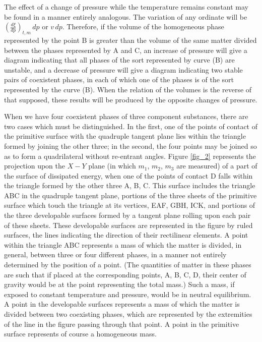 \documentclass[12pt]{memoir}
\begin{document}
The effect of a change of pressure while the temperature remains constant may be found in a manner entirely analogous. The variation of any ordinate will be $\left(\frac{d \xi}{dp}\right)_{t,m} \, dp$ or $v \, dp$.  Therefore, if the volume of the homogeneous phase represented by the point B is greater than the volume of the same matter divided between the phases represented by A and C, an increase of pressure will give a diagram indicating that all phases of the sort represented by curve (B) are unstable, and a decrease of pressure will give a diagram indicating two stable pairs of coexistent phases, in each of which one of the phases is of the sort represented by the curve (B). When the relation of the volumes is the reverse of that supposed, these results will be produced by the opposite changes of pressure.


When we have four coexistent phases of three component substances, there are two cases which must be distinguished. In the first, one of the points of contact of the primitive surface with the quadruple tangent plane lies within the triangle formed by joining the other three; in the second, the four points may be joined so as to form a quadrilateral without re-entrant angles. Figure \ref{fig_2} represents the projection upon the $X\!-Y$ plane (in which $m_1$, $m_2$, $m_3$ are measured) of a part of the surface of dissipated energy, when one of the points of contact D falls within the triangle formed by the other three A, B, C. This surface includes the triangle ABC in the quadruple tangent plane, portions of the three sheets of the primitive surface which touch the triangle at its vertices, EAF, GBH, ICK, and portions of the three developable surfaces formed by a tangent plane rolling upon each pair of these sheets. These developable surfaces are represented in the figure by ruled surfaces, the lines indicating the direction of their rectilinear elements. A point within the triangle ABC represents a mass of which the matter is divided, in general, between three or four different phases, in a manner not entirely determined by the position of a point. (The quantities of matter in these phases are such that if placed at the corresponding points, A, B, C, D, their center of gravity would be at the point representing the total mass.) Such a mass, if exposed to constant temperature and pressure, would be in neutral equilibrium. A point in the developable surfaces represents a mass of which the matter is divided between two coexisting phases, which are represented by the extremities of the line in the figure passing through that point. A point in the primitive surface represents of course a homogeneous mass.
\end{document}
